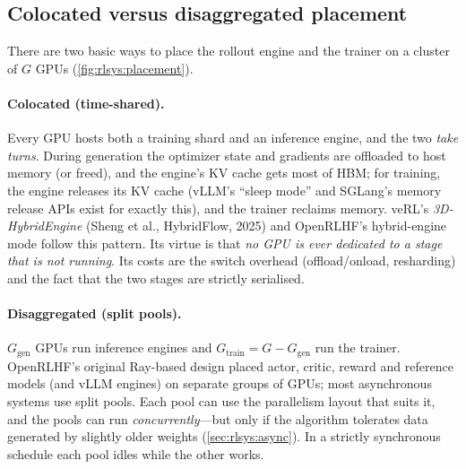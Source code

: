 \subsection{Colocated versus disaggregated placement}

There are two basic ways to place the rollout engine and the trainer on a cluster of $G$
GPUs (\cref{fig:rlsys:placement}).

\paragraph{Colocated (time-shared).} Every GPU hosts both a training shard and an inference
engine, and the two \emph{take turns}. During generation the optimizer state and gradients are
offloaded to host memory (or freed), and the engine's KV cache gets most of HBM; for
training, the engine releases its KV cache (vLLM's ``sleep mode'' and SGLang's memory
release APIs exist for exactly this), and the trainer reclaims memory. veRL's
\emph{3D-HybridEngine} (Sheng et al., HybridFlow, 2025) and OpenRLHF's hybrid-engine mode
follow this pattern. Its virtue is that \emph{no GPU is ever dedicated to a stage that is not
running}. Its costs are the switch overhead (offload/onload, resharding) and the fact that
the two stages are strictly serialised.

\paragraph{Disaggregated (split pools).} $G_{\text{gen}}$ GPUs run inference engines and
$G_{\text{train}} = G - G_{\text{gen}}$ run the trainer. OpenRLHF's original Ray-based design
placed actor, critic, reward and reference models (and vLLM engines) on separate groups of
GPUs; most asynchronous systems use split pools. Each pool can use the parallelism layout
that suits it, and the pools can run \emph{concurrently}---but only if the algorithm tolerates
data generated by slightly older weights (\cref{sec:rlsys:async}). In a strictly synchronous
schedule each pool idles while the other works.

